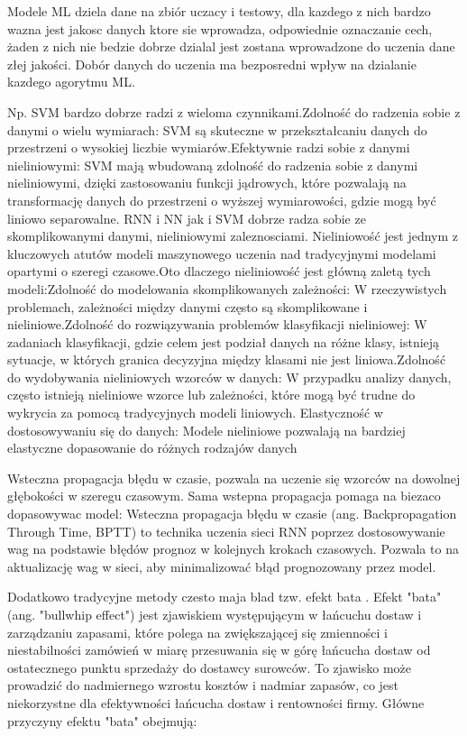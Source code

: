 Modele ML dziela dane na zbiór uczacy i testowy, dla kazdego z nich bardzo wazna jest jakosc danych ktore sie wprowadza, odpowiednie oznaczanie cech, żaden z nich nie bedzie dobrze dzialal jest zostana wprowadzone do uczenia dane złej jakości. Dobór danych do uczenia ma bezposredni wpływ na dzialanie kazdego agorytmu ML.

Np. SVM bardzo dobrze radzi z wieloma czynnikami.Zdolność do radzenia sobie z danymi o wielu wymiarach: SVM są skuteczne w przekształcaniu danych do przestrzeni o wysokiej liczbie wymiarów.Efektywnie radzi sobie z danymi nieliniowymi: SVM mają wbudowaną zdolność do radzenia sobie z danymi nieliniowymi, dzięki zastosowaniu funkcji jądrowych, które pozwalają na transformację danych do przestrzeni o wyższej wymiarowości, gdzie mogą być liniowo separowalne.
RNN i NN jak i SVM dobrze radza sobie ze skomplikowanymi danymi, nieliniowymi zaleznosciami. Nieliniowość jest jednym z kluczowych atutów modeli maszynowego uczenia nad tradycyjnymi modelami opartymi o szeregi czasowe.Oto dlaczego nieliniowość jest główną zaletą tych modeli:Zdolność do modelowania skomplikowanych zależności: W rzeczywistych problemach, zależności między danymi często są skomplikowane i nieliniowe.Zdolność do rozwiązywania problemów klasyfikacji nieliniowej: W zadaniach klasyfikacji, gdzie celem jest podział danych na różne klasy, istnieją sytuacje, w których granica decyzyjna między klasami nie jest liniowa.Zdolność do wydobywania nieliniowych wzorców w danych: W przypadku analizy danych, często istnieją nieliniowe wzorce lub zależności, które mogą być trudne do wykrycia za pomocą tradycyjnych modeli liniowych. Elastyczność w dostosowywaniu się do danych: Modele nieliniowe pozwalają na bardziej elastyczne dopasowanie do różnych rodzajów danych

Wsteczna propagacja błędu w czasie, pozwala na uczenie się wzorców na dowolnej głębokości
w szeregu czasowym. Sama wstepna propagacja pomaga na biezaco dopasowywac model: Wsteczna propagacja błędu w czasie (ang. Backpropagation Through Time, BPTT) to technika uczenia sieci RNN poprzez dostosowywanie wag na podstawie błędów prognoz w kolejnych krokach czasowych. Pozwala to na aktualizację wag w sieci, aby minimalizować błąd prognozowany przez model.

Dodatkowo tradycyjne metody czesto maja blad tzw. efekt bata . Efekt "bata" (ang. "bullwhip effect") jest zjawiskiem występującym w łańcuchu dostaw i zarządzaniu zapasami, które polega na zwiększającej się zmienności i niestabilności zamówień w miarę przesuwania się w górę łańcucha dostaw od ostatecznego punktu sprzedaży do dostawcy surowców. To zjawisko może prowadzić do nadmiernego wzrostu kosztów i nadmiar zapasów, co jest niekorzystne dla efektywności łańcucha dostaw i rentowności firmy.
Główne przyczyny efektu "bata" obejmują:

